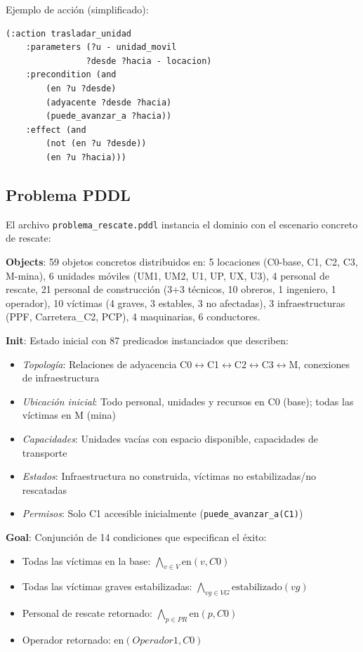 \documentclass[conference]{IEEEtran}
\begin{document}
    Ejemplo de acción (simplificado):

    \begin{lstlisting}[style=pddlstyle]
    (:action trasladar_unidad
    :parameters (?u - unidad_movil 
                ?desde ?hacia - locacion)
    :precondition (and
        (en ?u ?desde)
        (adyacente ?desde ?hacia)
        (puede_avanzar_a ?hacia))
    :effect (and
        (not (en ?u ?desde))
        (en ?u ?hacia)))
    \end{lstlisting}

    \subsection{Problema PDDL}

    El archivo \texttt{problema\_rescate.pddl} instancia el dominio con el escenario concreto de rescate:

    \textbf{Objects}: 59 objetos concretos distribuidos en: 5 locaciones (C0-base, C1, C2, C3, M-mina), 6 unidades móviles (UM1, UM2, U1, UP, UX, U3), 4 personal de rescate, 21 personal de construcción (3+3 técnicos, 10 obreros, 1 ingeniero, 1 operador), 10 víctimas (4 graves, 3 estables, 3 no afectadas), 3 infraestructuras (PPF, Carretera\_C2, PCP), 4 maquinarias, 6 conductores.

    \textbf{Init}: Estado inicial con 87 predicados instanciados que describen:
    \begin{itemize}[leftmargin=*,itemsep=1pt]
    \item \textit{Topología}: Relaciones de adyacencia C0$\leftrightarrow$C1$\leftrightarrow$C2$\leftrightarrow$C3$\leftrightarrow$M, conexiones de infraestructura
    \item \textit{Ubicación inicial}: Todo personal, unidades y recursos en C0 (base); todas las víctimas en M (mina)
    \item \textit{Capacidades}: Unidades vacías con espacio disponible, capacidades de transporte
    \item \textit{Estados}: Infraestructura no construida, víctimas no estabilizadas/no rescatadas
    \item \textit{Permisos}: Solo C1 accesible inicialmente (\texttt{puede\_avanzar\_a(C1)})
    \end{itemize}

    \textbf{Goal}: Conjunción de 14 condiciones que especifican el éxito:
    \begin{itemize}[leftmargin=*,itemsep=1pt]
    \item Todas las víctimas en la base: $\bigwedge_{v \in V} \textrm{en}(v, C0)$
    \item Todas las víctimas graves estabilizadas: $\bigwedge_{vg \in VG} \textrm{estabilizado}(vg)$
    \item Personal de rescate retornado: $\bigwedge_{p \in PR} \textrm{en}(p, C0)$
    \item Operador retornado: $\textrm{en}(Operador1, C0)$
    \end{itemize}
\end{document}
